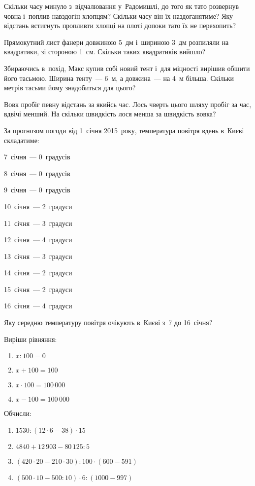Скільки часу минуло з~відчалювання у~Радомишлі, до того як тато
розвернув човна і~поплив навздогін хлопцям?
Скільки часу він їх наздоганятиме?
Яку відстань встигнуть пропливти хлопці на плоті допоки тато їх не перехопить?


\problem
Прямокутний лист фанери довжиною 5~дм і~шириною 3~дм розпиляли на квадратики,
зі стороною 1~см.
Скільки таких квадратиків вийшло?


\problem
Збираючись в~похід, Макс купив собі новий тент і~для міцності вирішив
обшити його тасьмою. Ширина тенту~--- 6~м, а довжина~--- на 4~м більша.
Скільки метрів тасьми йому знадобиться для цього?


\problem
Вовк пробіг певну відстань за якийсь час.
Лось чверть цього шляху пробіг за час, вдвічі менший.
На скільки швидкість лося менша за швидкість вовка?


\problem
За прогнозом погоди від 1~січня 2015~року, температура повітря вдень
в~Києві складатиме:

\begin{multicols}{2}
    7~січня~--- 0~градусів

    8~січня~--- 0~градусів

    9~січня~--- 0~градусів

    10~січня~--- 2~градуси

    11~січня~--- 3~градуси

    12~січня~--- 4~градуси

    13~січня~--- 3~градуси

    14~січня~--- 2~градуси

    15~січня~--- 2~градуси

    16~січня~--- 4~градуси
\end{multicols}

Яку середню температуру повітря очікують в~Києві з~7 до 16~січня?


\problem
Виріши рівняння:
\begin{multicols}{2}
    \begin{enumerate}
        \item $x : 100 = 0$
        \item $x + 100 = 100$
        \item $x \cdot 100 = 100\,000$
        \item $x - 100 = 100\,000$
    \end{enumerate}
\end{multicols}


\problem
Обчисли:
\begin{enumerate}
    \item $1530 : (12 \cdot 6 - 38) \cdot 15$
    \item $4840 + 12\,903 - 80\,125 : 5$
    \item $(420 \cdot 20 - 210 \cdot 30) : 100 \cdot (600 - 591)$
    \item $(500 \cdot 10 - 500 : 10) \cdot 6 : (1000 - 997)$
\end{enumerate}


